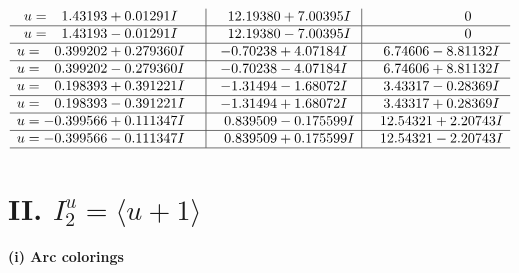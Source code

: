 \documentclass[1p]{elsarticle_modified}
\theoremstyle{definition}
\begin{document}
$$\begin{array}{c|c|c}
\begin{aligned}
u &= \phantom{-}1.43193 + 0.01291 I\end{aligned}
 & \phantom{-}12.19380 + 7.00395 I & \phantom{-0.000000 } 0 \\ \hline\begin{aligned}
u &= \phantom{-}1.43193 - 0.01291 I\end{aligned}
 & \phantom{-}12.19380 - 7.00395 I & \phantom{-0.000000 } 0 \\ \hline\begin{aligned}
u &= \phantom{-}0.399202 + 0.279360 I\end{aligned}
 & -0.70238 + 4.07184 I & \phantom{-}6.74606 - 8.81132 I \\ \hline\begin{aligned}
u &= \phantom{-}0.399202 - 0.279360 I\end{aligned}
 & -0.70238 - 4.07184 I & \phantom{-}6.74606 + 8.81132 I \\ \hline\begin{aligned}
u &= \phantom{-}0.198393 + 0.391221 I\end{aligned}
 & -1.31494 - 1.68072 I & \phantom{-}3.43317 - 0.28369 I \\ \hline\begin{aligned}
u &= \phantom{-}0.198393 - 0.391221 I\end{aligned}
 & -1.31494 + 1.68072 I & \phantom{-}3.43317 + 0.28369 I \\ \hline\begin{aligned}
u &= -0.399566 + 0.111347 I\end{aligned}
 & \phantom{-}0.839509 - 0.175599 I & \phantom{-}12.54321 + 2.20743 I \\ \hline\begin{aligned}
u &= -0.399566 - 0.111347 I\end{aligned}
 & \phantom{-}0.839509 + 0.175599 I & \phantom{-}12.54321 - 2.20743 I\\
 \hline 
 \end{array}$$\newpage\newpage\renewcommand{\arraystretch}{1}
\centering \section*{II. $I^u_{2}= \langle u+1 \rangle$}
\flushleft \textbf{(i) Arc colorings}\\
\end{document}
